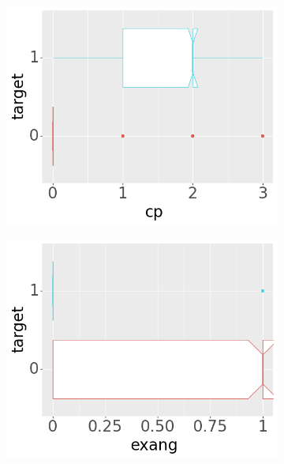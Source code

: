 \begin{figure}[btp]
     \begin{subfigure}[b]{0.32\textwidth}
         \centering
         \includegraphics[width=\textwidth]{plots/target-cp}
     \end{subfigure}
     \begin{subfigure}[b]{0.32\textwidth}
         \centering
         \includegraphics[width=\textwidth]{plots/target-exang}
     \end{subfigure}
     \begin{subfigure}[b]{0.32\textwidth}
         \centering

\end{subfigure}
\end{figure}
